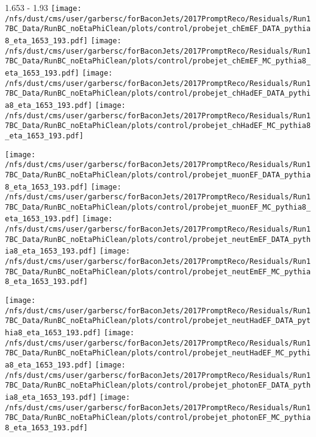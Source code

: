 \documentclass[t,compress]{beamer}
\begin{document}
\begin{frame}{1.653 - 1.93}
	\texttt{[image: /nfs/dust/cms/user/garbersc/forBaconJets/2017PromptReco/Residuals/Run17BC\_Data/RunBC\_noEtaPhiClean/plots/control/probejet\_chEmEF\_DATA\_pythia8\_eta\_1653\_193.pdf]}
	\texttt{[image: /nfs/dust/cms/user/garbersc/forBaconJets/2017PromptReco/Residuals/Run17BC\_Data/RunBC\_noEtaPhiClean/plots/control/probejet\_chEmEF\_MC\_pythia8\_eta\_1653\_193.pdf]}
	\texttt{[image: /nfs/dust/cms/user/garbersc/forBaconJets/2017PromptReco/Residuals/Run17BC\_Data/RunBC\_noEtaPhiClean/plots/control/probejet\_chHadEF\_DATA\_pythia8\_eta\_1653\_193.pdf]}
	\texttt{[image: /nfs/dust/cms/user/garbersc/forBaconJets/2017PromptReco/Residuals/Run17BC\_Data/RunBC\_noEtaPhiClean/plots/control/probejet\_chHadEF\_MC\_pythia8\_eta\_1653\_193.pdf]}
\newline

\vspace{-0.65cm}
	\texttt{[image: /nfs/dust/cms/user/garbersc/forBaconJets/2017PromptReco/Residuals/Run17BC\_Data/RunBC\_noEtaPhiClean/plots/control/probejet\_muonEF\_DATA\_pythia8\_eta\_1653\_193.pdf]}
	\texttt{[image: /nfs/dust/cms/user/garbersc/forBaconJets/2017PromptReco/Residuals/Run17BC\_Data/RunBC\_noEtaPhiClean/plots/control/probejet\_muonEF\_MC\_pythia8\_eta\_1653\_193.pdf]}
	\texttt{[image: /nfs/dust/cms/user/garbersc/forBaconJets/2017PromptReco/Residuals/Run17BC\_Data/RunBC\_noEtaPhiClean/plots/control/probejet\_neutEmEF\_DATA\_pythia8\_eta\_1653\_193.pdf]}
	\texttt{[image: /nfs/dust/cms/user/garbersc/forBaconJets/2017PromptReco/Residuals/Run17BC\_Data/RunBC\_noEtaPhiClean/plots/control/probejet\_neutEmEF\_MC\_pythia8\_eta\_1653\_193.pdf]}
\newline

\vspace{-0.65cm}
	\texttt{[image: /nfs/dust/cms/user/garbersc/forBaconJets/2017PromptReco/Residuals/Run17BC\_Data/RunBC\_noEtaPhiClean/plots/control/probejet\_neutHadEF\_DATA\_pythia8\_eta\_1653\_193.pdf]}
	\texttt{[image: /nfs/dust/cms/user/garbersc/forBaconJets/2017PromptReco/Residuals/Run17BC\_Data/RunBC\_noEtaPhiClean/plots/control/probejet\_neutHadEF\_MC\_pythia8\_eta\_1653\_193.pdf]}
	\texttt{[image: /nfs/dust/cms/user/garbersc/forBaconJets/2017PromptReco/Residuals/Run17BC\_Data/RunBC\_noEtaPhiClean/plots/control/probejet\_photonEF\_DATA\_pythia8\_eta\_1653\_193.pdf]}
	\texttt{[image: /nfs/dust/cms/user/garbersc/forBaconJets/2017PromptReco/Residuals/Run17BC\_Data/RunBC\_noEtaPhiClean/plots/control/probejet\_photonEF\_MC\_pythia8\_eta\_1653\_193.pdf]}
\end{frame}
\end{document}
